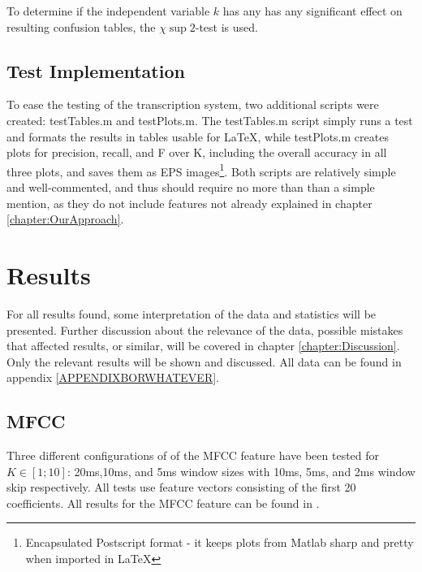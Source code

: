 	To determine if the independent variable $k$ has any has any significant effect on resulting confusion tables, the $\chi\sup{2}$-test is used. 	
		
		
	\subsection{Test Implementation}		%
		To ease the testing of the transcription system, two additional scripts were created: testTables.m and testPlots.m.
		The testTables.m script simply runs a test and formats the results in tables usable for \LaTeX, while testPlots.m creates plots for precision, recall, and F over K, including the overall accuracy in all three plots, and saves them as EPS images\footnote{Encapsulated Postscript format - it keeps plots from Matlab sharp and pretty when imported in \LaTeX}. Both scripts are relatively simple and well-commented, and thus should require no more than than a simple mention, as they do not include features not already explained in chapter \ref{chapter:OurApproach}.
			
 
\section{Results}
For all results found, some interpretation of the data and statistics will be presented. Further discussion about the relevance of the data, possible mistakes that affected results, or similar, will be covered in chapter \ref{chapter:Discussion}. Only the relevant results will be shown and discussed. All data can be found in appendix \ref{APPENDIXBORWHATEVER}. 


	\subsection{MFCC}
		
		
		Three different configurations of of the MFCC feature have been tested for $K \in [1;10]$: 20ms,10ms, and 5ms window sizes with 10ms, 5ms, and 2ms window skip respectively. All tests use feature vectors consisting of the first 20 coefficients. All results for the MFCC feature can be found in .
		
		

		
		
			
	